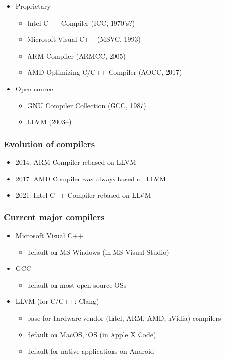\documentclass[12pt]{article}
\begin{document}
\begin{itemize}
    \item Proprietary
    \begin{itemize}
        \item Intel C++ Compiler (ICC, 1970's?)
        \item Microsoft Visual C++ (MSVC, 1993)
        \item ARM Compiler (ARMCC, 2005)
        \item AMD Optimizing C/C++ Compiler (AOCC, 2017)
    \end{itemize}
    \item Open source
    \begin{itemize}
        \item GNU Compiler Collection (GCC, 1987)
        \item LLVM (2003--)
    \end{itemize}
\end{itemize}
\subsubsection{Evolution of compilers}
\begin{itemize}
    \item 2014: ARM Compiler rebased on LLVM
    \item 2017: AMD Compiler was always based on LLVM
    \item 2021: Intel C++ Compiler rebased on LLVM
\end{itemize}

\subsubsection{Current major compilers}
\begin{itemize}
    \item Microsoft Visual C++
    \begin{itemize}
        \item default on MS Windows (in MS Visual Studio)
    \end{itemize}
    \item GCC
    \begin{itemize}
        \item default on most open source OSs
    \end{itemize}
    \item LLVM (for C/C++: Clang)
    \begin{itemize}
        \item base for hardware vendor (Intel, ARM, AMD, nVidia) compilers
        \item default on MacOS, iOS (in Apple X Code)
        \item default for native applications on Android
    \end{itemize}
\end{itemize}
\end{document}

